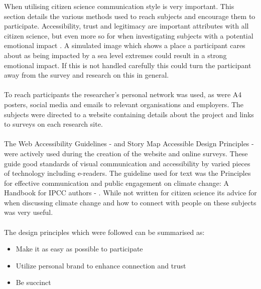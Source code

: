 When utilising citizen science communication style is very important. This section details the various methods used to reach subjects and encourage them to participate. Accessibility, trust and legitimacy are important attributes with all citizen science, but even more so for when investigating subjects with a potential emotional impact \cite{tweddle_guide_2012}. A simulated image which shows a place a participant cares about as being impacted by a sea level extremes could result in a strong emotional impact. If this is not handled carefully this could turn the participant away from the survey and research on this in general.
\paragraph{}

To reach participants the researcher's personal network was used, as were A4 posters, social media and emails to relevant organisations and employers. The subjects were directed to a website containing details about the project and links to surveys on each research site.
\paragraph{}

The Web Accessibility Guidelines - \cite{henry_web_2022} and Story Map Accessible Design Principles - \cite{todd_liz_getting_nodate} were actively used during the creation of the website and online surveys. These guide good standards of visual communication and accessibility by varied pieces of technology including e-readers. The guideline used for text was the Principles for effective communication and public engagement on	climate change: A Handbook for IPCC authors - \cite{corner_a_principles_2018}. While not written for citizen science its advice for when discussing climate change and how to connect with people on these subjects was very useful. 
\paragraph{}

The design principles which were followed can be summarised as:
\begin{itemize}
    \item Make it as easy as possible to participate
    \item Utilize personal brand to enhance connection and trust
    \item Be succinct
\end{itemize}
